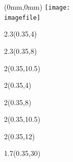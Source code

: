 \begin{textblock*}{\paperwidth}(0mm,0mm)
  \texttt{[image: \\imagefile]}
\end{textblock*}

\begin{textblock*}{2.3\TPHorizModule}(0.35\TPHorizModule,4\TPVertModule)
  \textcolor{white}{\titlefmt}
\end{textblock*}

\begin{textblock*}{2.3\TPHorizModule}(0.35\TPHorizModule,8\TPVertModule)
  \textcolor{white}{\parttitlefmt}
\end{textblock*}

\begin{textblock*}{2\TPHorizModule}(0.35\TPHorizModule,10.5\TPVertModule)
  \textcolor{white}{\authorfmt}
\end{textblock*}

\null\cleardoublepage


\begin{textblock*}{2\TPHorizModule}(0.35\TPHorizModule,4\TPVertModule)
  \titlefmt
\end{textblock*}

\begin{textblock*}{2\TPHorizModule}(0.35\TPHorizModule,8\TPVertModule)
  \parttitlefmt
\end{textblock*}

\begin{textblock*}{2\TPHorizModule}(0.35\TPHorizModule,10.5\TPVertModule)
  \authorfmt
\end{textblock*}

\begin{textblock*}{2\TPHorizModule}(0.35\TPHorizModule,12\TPVertModule)
  \affiliation
\end{textblock*}

\begin{textblock*}{1.7\TPHorizModule}(0.35\TPHorizModule,30\TPVertModule)
  \edition
\end{textblock*}
\endgroup
